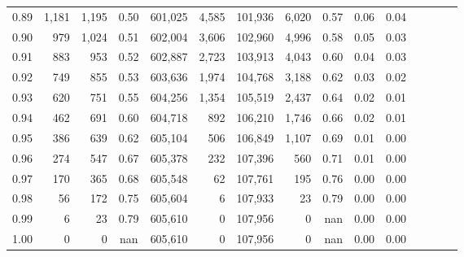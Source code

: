 \begin{tabular}{rrrcrrrrrrrrrrr}
0.89 &   1,181 &  1,195 &                                       0.50 &  601,025 &    4,585 &  101,936 &    6,020 &  0.57 &  0.06 &                         0.04 \\
0.90 &     979 &  1,024 &                                       0.51 &  602,004 &    3,606 &  102,960 &    4,996 &  0.58 &  0.05 &                         0.03 \\
0.91 &     883 &    953 &                                       0.52 &  602,887 &    2,723 &  103,913 &    4,043 &  0.60 &  0.04 &                         0.03 \\
0.92 &     749 &    855 &                                       0.53 &  603,636 &    1,974 &  104,768 &    3,188 &  0.62 &  0.03 &                         0.02 \\
0.93 &     620 &    751 &                                       0.55 &  604,256 &    1,354 &  105,519 &    2,437 &  0.64 &  0.02 &                         0.01 \\
0.94 &     462 &    691 &                                       0.60 &  604,718 &      892 &  106,210 &    1,746 &  0.66 &  0.02 &                         0.01 \\
0.95 &     386 &    639 &                                       0.62 &  605,104 &      506 &  106,849 &    1,107 &  0.69 &  0.01 &                         0.00 \\
0.96 &     274 &    547 &                                       0.67 &  605,378 &      232 &  107,396 &      560 &  0.71 &  0.01 &                         0.00 \\
0.97 &     170 &    365 &                                       0.68 &  605,548 &       62 &  107,761 &      195 &  0.76 &  0.00 &                         0.00 \\
0.98 &      56 &    172 &                                       0.75 &  605,604 &        6 &  107,933 &       23 &  0.79 &  0.00 &                         0.00 \\
0.99 &       6 &     23 &                                       0.79 &  605,610 &        0 &  107,956 &        0 &   nan &  0.00 &                         0.00 \\
1.00 &       0 &      0 &                                        nan &  605,610 &        0 &  107,956 &        0 &   nan &  0.00 &                         0.00 \\
\bottomrule
\end{tabular}
